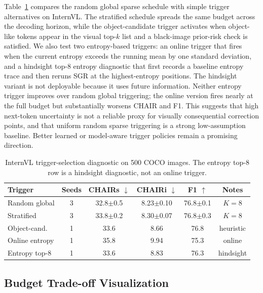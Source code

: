 \documentclass[11pt]{article}
\begin{document}
Table~\ref{tab:trigger_selection} compares the random global sparse schedule with simple trigger alternatives on InternVL.
The stratified schedule spreads the same budget across the decoding horizon, while the object-candidate trigger activates when object-like tokens appear in the visual top-$k$ list and a black-image prior-risk check is satisfied.
We also test two entropy-based triggers: an online trigger that fires when the current entropy exceeds the running mean by one standard deviation, and a hindsight top-8 entropy diagnostic that first records a baseline entropy trace and then reruns SGR at the highest-entropy positions.
The hindsight variant is not deployable because it uses future information.
Neither entropy trigger improves over random global triggering; the online version fires nearly at the full budget but substantially worsens CHAIR and F1.
This suggests that high next-token uncertainty is not a reliable proxy for visually consequential correction points, and that uniform random sparse triggering is a strong low-assumption baseline.
Better learned or model-aware trigger policies remain a promising direction.

\begin{table}[h]
  \centering
  \small
  \setlength{\tabcolsep}{3.0pt}
  \begin{tabular}{lccccc}
  \hline
  Trigger & Seeds & CHAIRs $\downarrow$ & CHAIRi $\downarrow$ & F1 $\uparrow$ & Notes \\
  \hline
  Random global & 3 & 32.8$\pm$0.5 & 8.23$\pm$0.10 & 76.8$\pm$0.1 & $K=8$ \\
  Stratified & 3 & 33.8$\pm$0.2 & 8.30$\pm$0.07 & 76.8$\pm$0.3 & $K=8$ \\
  Object-cand. & 1 & 33.6 & 8.66 & 76.8 & heuristic \\
  Online entropy & 1 & 35.8 & 9.94 & 75.3 & online \\
  Entropy top-8 & 1 & 33.6 & 8.83 & 76.3 & hindsight \\
  \hline
  \end{tabular}
  \caption{
  InternVL trigger-selection diagnostic on 500 COCO images.
  The entropy top-8 row is a hindsight diagnostic, not an online trigger.
  }
  \label{tab:trigger_selection}
\end{table}

\subsection{Budget Trade-off Visualization}
\end{document}
